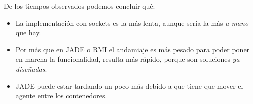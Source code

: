 De los tiempos observados podemos concluir qué:

\begin{itemize}
    \item La implementación con sockets es la más lenta, aunque sería la más \textit{a mano} que hay.
    \item Por más que en JADE o RMI el andamiaje es más pesado para poder poner en marcha la funcionalidad, resulta más rápido, porque son soluciones \textit{ya diseñadas}.
    \item JADE puede estar tardando un poco más debido a que tiene que mover el agente entre los contenedores. 
\end{itemize}

\clearpage
\printbibliography



